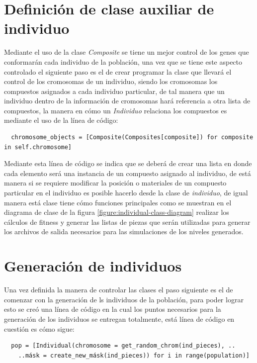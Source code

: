 \section{Definición de clase auxiliar de individuo}
\label{section:definition_of_clases}

Mediante el uso de la clase \textit{Composite} se tiene un mejor control de los genes
que conformarán cada individuo de la población, una vez que se tiene este
aspecto controlado el siguiente paso es el de crear programar la clase que
llevará el control de los cromosomas de un individuo, siendo los cromosomas los
compuestos asignados a cada individuo particular, de tal manera que un individuo
dentro de la información de cromosomas hará referencia a otra lista de
compuestos, la manera en cómo un \textit{Individuo} relaciona los compuestos es
mediante el uso de la línea de código:

\begin{verbatim}
  chromosome_objects = [Composite(Composites[composite]) for composite in self.chromosome]
\end{verbatim}

Mediante esta línea de código se indica que se deberá de crear una lista en donde
cada elemento será una instancia de un compuesto asignado al individuo, de está
manera si se requiere modificar la posición o materiales de un compuesto
particular en el individuo es posible hacerlo desde la clase de
\textit{individuo}, de igual manera está clase tiene cómo funciones principales
como se muestran en el diagrama de clase de la figura
\ref{figure:individual-class-diagram} realizar los cálculos de fitness y generar
las listas de piezas que serán utilizadas para generar los archivos de salida
necesarios para las simulaciones de los niveles generados.

\section{Generación de individuos}
\label{section:ind_generation}

Una vez definida la manera de controlar las clases el paso siguiente es el de
comenzar con la generación de ls individuos de la población, para poder lograr
esto se creó una línea de código en la cual los puntos necesarios para la
generación de los individuos se entregan totalmente, está línea de código en
cuestión es cómo sigue: 

\begin{verbatim}
  pop = [Individual(chromosome = get_random_chrom(ind_pieces), ..
    ..másk = create_new_másk(ind_pieces)) for i in range(population)]
\end{verbatim}

